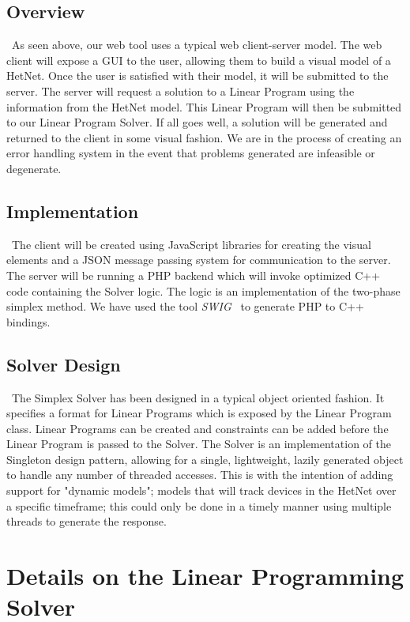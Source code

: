 \documentclass[11pt]{article}
\begin{document}
\subsection{Overview}
~\indent As seen above, our web tool uses a typical web client-server model. The web client
will expose a GUI to the user, allowing them to build a visual model of a 
HetNet. Once the user is satisfied with their model, it will be submitted to the 
server. The server will request a solution to a Linear Program using the information 
from the HetNet model. This Linear Program will then be submitted to our Linear
Program Solver. If all goes well, a solution will be generated and returned to 
the client in some visual fashion. We are in the process of creating an 
error handling system in the event that problems generated are infeasible or 
degenerate. 

\subsection{Implementation}
~\indent The client will be created using JavaScript libraries for creating the visual 
elements and a JSON message passing system for communication to the server.
The server will be running a PHP backend which will invoke optimized
C++ code containing the Solver logic. The logic is an implementation of the two-phase
simplex method. We have used the tool \textit{SWIG}~\cite{swig} to generate  
PHP to C++ bindings. 

\subsection{Solver Design}
~\indent The Simplex Solver has been designed in a typical object oriented fashion. 
It specifies a format for Linear Programs which is exposed by the Linear Program
class. Linear Programs can be created and constraints can be added before 
the Linear Program is passed to the Solver. The Solver is an implementation of 
the Singleton design pattern, allowing for a single, lightweight, lazily generated 
object to handle any number of threaded accesses. This is with the intention of 
adding support for "dynamic models"; models that will track devices in the HetNet
over a specific timeframe; this could only be done in a timely manner using 
multiple threads to generate the response. 

\section{Details on the Linear Programming Solver}
\end{document}
